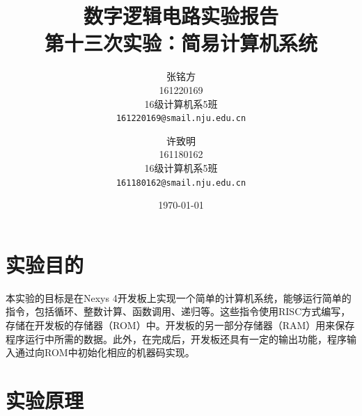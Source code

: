 \documentclass[titlepage, 11pt]{article}
\begin{document}
	\title{\vspace{-25mm}数字逻辑电路实验报告\\\vspace{15mm}\Huge\textbf{第十三次实验：简易计算机系统}\vspace{60mm}}
	\author{张铭方\\161220169\\16级计算机系5班\\\texttt{161220169@smail.nju.edu.cn}\and 许致明\\161180162\\16级计算机系5班\\\texttt{161180162@smail.nju.edu.cn}}\date{\vspace{30mm}\today}
	\maketitle
	\section{实验目的}
	本实验的目标是在Nexys 4开发板上实现一个简单的计算机系统，能够运行简单的指令，包括循环、整数计算、函数调用、递归等。这些指令使用RISC方式编写，存储在开发板的存储器（ROM）中。开发板的另一部分存储器（RAM）用来保存程序运行中所需的数据。此外，在完成后，开发板还具有一定的输出功能，程序输入通过向ROM中初始化相应的机器码实现。
	\section{实验原理}
\end{document}
